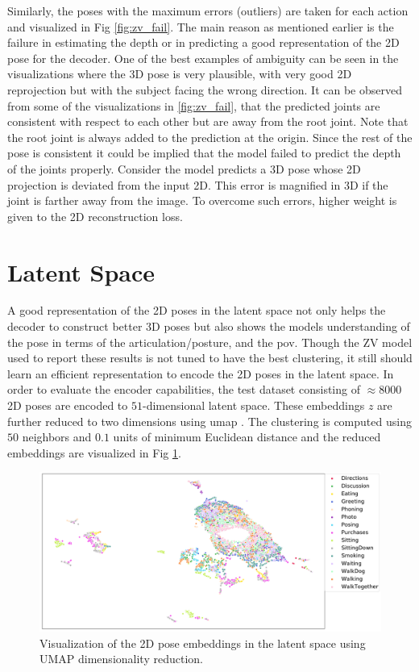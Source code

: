 Similarly, the poses with the maximum errors (outliers) are taken for each action and visualized in Fig \ref{fig:zv_fail}. The main reason as mentioned earlier is the failure in estimating the depth or in predicting a good representation of the 2D pose for the decoder. One of the best examples of ambiguity can be seen in the visualizations where the 3D pose is very plausible, with very good 2D reprojection but with the subject facing the wrong direction. It can be observed from some of the visualizations in \ref{fig:zv_fail}, that the predicted joints are consistent with respect to each other but are away from the root joint. Note that the root joint is always added to the prediction at the origin. Since the rest of the pose is consistent it could be implied that the model failed to predict the depth of the joints properly. Consider the model predicts a 3D pose whose 2D projection is deviated from the input 2D. This error is magnified in 3D if the joint is farther away from the image. To overcome such errors, higher weight is given to the 2D reconstruction loss.



\section{Latent Space}
A good representation of the 2D poses in the latent space not only helps the decoder to construct better 3D poses but also shows the models understanding of the pose in terms of the articulation/posture, and the \ac{pov}. Though the ZV model used to report these results is not tuned to have the best clustering, it still should learn an efficient representation to encode the 2D poses in the latent space. In order to evaluate the encoder capabilities, the test dataset consisting of $\approx 8000$ 2D poses are encoded to $51$-dimensional latent space. These embeddings $z$ are further reduced to two dimensions using \ac{umap} \cite{umap}. The clustering is computed using $50$ neighbors and $0.1$ units of minimum Euclidean distance and the reduced embeddings are visualized in Fig \ref{fig:latentspace}.

\begin{figure}[h]
    \centering
    \includegraphics[width=\linewidth]{figures/results/umap.pdf}
    \caption{Visualization of the 2D pose embeddings in the latent space using UMAP dimensionality reduction.}
    \label{fig:latentspace}
\end{figure}

